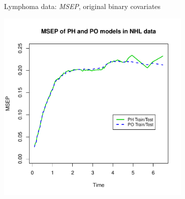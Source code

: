\documentclass[11pt]{beamer}
\begin{document}

\begin{frame}{Lymphoma data: \textsl{MSEP}, original binary
covariates}

\begin{center}
\includegraphics[width=0.7\textwidth]{./figures/NHLtraintest.pdf}
\end{center}
\end{frame}
\end{document}
